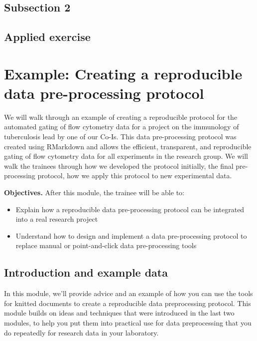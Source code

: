 \documentclass[]{tufte-book}
\providecommand{\tightlist}{%
  \setlength{\itemsep}{0pt}\setlength{\parskip}{0pt}}
\begin{document}
\hypertarget{subsection-2-9}{%
\subsection{Subsection 2}\label{subsection-2-9}}

\hypertarget{applied-exercise-7}{%
\subsection{Applied exercise}\label{applied-exercise-7}}

\hypertarget{example-creating-a-reproducible-data-pre-processing-protocol}{%
\section{Example: Creating a reproducible data pre-processing protocol}\label{example-creating-a-reproducible-data-pre-processing-protocol}}

We will walk through an example of creating a reproducible protocol for the
automated gating of flow cytometry data for a project on the immunology of
tuberculosis lead by one of our Co-Is. This data pre-processing protocol was
created using RMarkdown and allows the efficient, transparent, and reproducible
gating of flow cytometry data for all experiments in the research group. We will
walk the trainees through how we developed the protocol initially, the final
pre-processing protocol, how we apply this protocol to new experimental data.

\textbf{Objectives.} After this module, the trainee will be able to:

\begin{itemize}
\tightlist
\item
  Explain how a reproducible data pre-processing protocol can be integrated into
  a real research project
\item
  Understand how to design and implement a data pre-processing protocol to
  replace manual or point-and-click data pre-processing tools
\end{itemize}

\hypertarget{introduction-and-example-data}{%
\subsection{Introduction and example data}\label{introduction-and-example-data}}

In this module, we'll provide advice and an example of how you can use the
tools for knitted documents to create a reproducible data preprocessing
protocol. This module builds on ideas and techniques that were introduced
in the last two modules, to help you put them into practical use for
data preprocessing that you do repeatedly for research data in your
laboratory.
\end{document}
